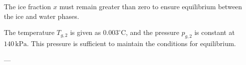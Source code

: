 The ice fraction \( x \) must remain greater than zero to ensure equilibrium between the ice and water phases.  

The temperature \( T_{g,2} \) is given as \( 0.003^\circ\text{C} \), and the pressure \( p_{g,2} \) is constant at \( 140 \, \text{kPa} \). This pressure is sufficient to maintain the conditions for equilibrium.  

---